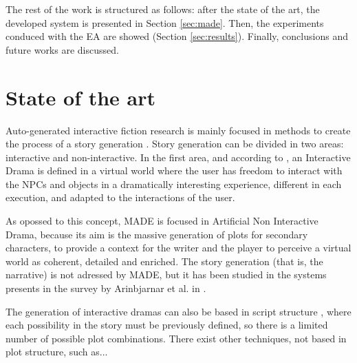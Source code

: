 \documentclass[runningheads]{llncs}
\begin{document}


The rest of the work is structured as follows: after the state of the art, the developed system is presented in Section \ref{sec:made}. Then, the experiments conduced with the EA are showed (Section \ref{sec:results}). Finally, conclusions and future works are discussed.


\section{State of the art}
\label{sec:soa}


Auto-generated interactive fiction research is mainly focused in methods to create the process of a story generation \cite{nairat2011character}. Story generation can be divided in two areas: interactive and non-interactive. In the first area, and according to \cite{ReviewArinbjarnar09}, an Interactive Drama is defined in a virtual world where the user has freedom to interact with the NPCs and objects in a dramatically interesting experience, different in each execution, and adapted to the interactions of the user.


As opossed to this concept, MADE is focused in Artificial Non Interactive Drama, because its aim is the massive generation of plots for secondary characters, to provide a context for the writer and the player to perceive a virtual world as coherent, detailed and enriched. The story generation (that is, the narrative) is not adressed by MADE, but it has been studied in the systems presents in the survey by Arinbjarnar et al. in \cite{ReviewArinbjarnar09}.


The generation of interactive dramas can also be based in script
structure \cite{ArchitectureYoung04}, where each possibility in the
story must be previously defined, so there is a limited number of
possible plot combinations. There exist other techniques, not based in
plot structure, such as... %
\end{document}
